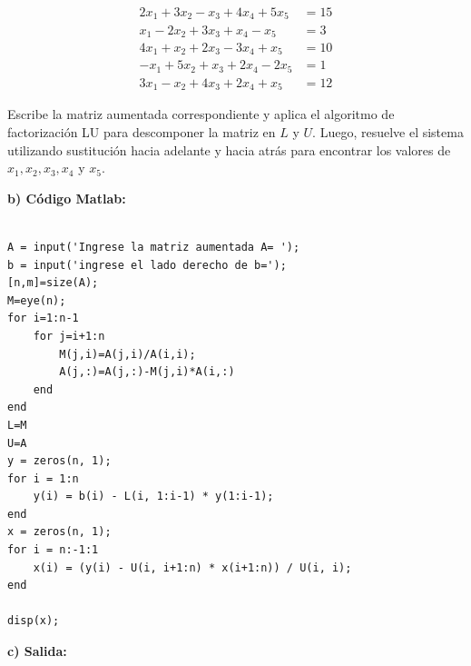 \documentclass[12pt,a4paper,twoside]{article}  %
\begin{document}
\[
\begin{aligned}
2x_1 + 3x_2 - x_3 + 4x_4 + 5x_5 &= 15 \\
x_1 - 2x_2 + 3x_3 + x_4 - x_5 &= 3 \\
4x_1 + x_2 + 2x_3 -  3x_4 + x_5 &= 10 \\
-x_1 +  5x_2 + x_3 + 2x_4 - 2x_5 &= 1 \\
3x_1 - x_2 + 4x_3 + 2x_4 + x_5 &= 12
\end{aligned}
\]

Escribe la matriz aumentada correspondiente y aplica el algoritmo de factorización LU para descomponer la matriz en \( L \) y \( U \). Luego, resuelve el sistema utilizando sustitución hacia adelante y hacia atrás para encontrar los valores de \( x_1, x_2, x_3, x_4 \) y \( x_5 \).




\textbf{b) Código Matlab:}

\begin{lstlisting}

A = input('Ingrese la matriz aumentada A= ');
b = input('ingrese el lado derecho de b=');
[n,m]=size(A);
M=eye(n);
for i=1:n-1
    for j=i+1:n
        M(j,i)=A(j,i)/A(i,i);
        A(j,:)=A(j,:)-M(j,i)*A(i,:)
    end
end
L=M
U=A
y = zeros(n, 1);
for i = 1:n
    y(i) = b(i) - L(i, 1:i-1) * y(1:i-1);
end
x = zeros(n, 1);
for i = n:-1:1
    x(i) = (y(i) - U(i, i+1:n) * x(i+1:n)) / U(i, i); 
end

disp(x);

\end{lstlisting}

\textbf{c) Salida:}
\end{document}
